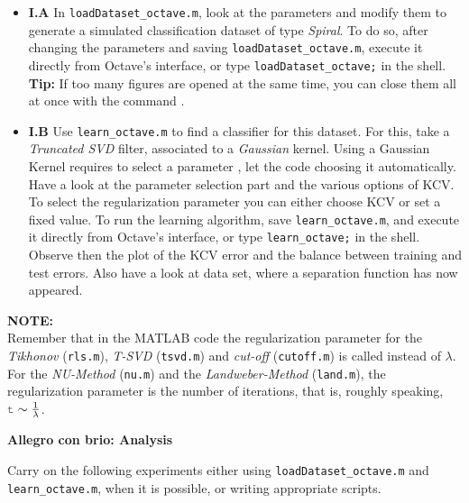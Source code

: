 \documentclass[DIN, pagenumber=false, fontsize=11pt, parskip=half]{scrartcl}
\newcommand{\mysection}[1]{\noindent\large\textbf{#1}}
\begin{document}
\begin{itemize}
	\item \textbf{I.A} In \texttt{loadDataset\_octave.m}, look at the parameters and modify them to generate a simulated classification dataset of type \textit{Spiral}.
	To do so, after changing the parameters and saving \texttt{loadDataset\_octave.m}, execute it directly from Octave's interface, or type \texttt{loadDataset\_octave;} in the shell.\\
	\textbf{Tip:} If too many figures are opened at the same time, you can close them all at once with the command .
	\item \textbf{I.B} 
	Use \texttt{learn\_octave.m} to find a  classifier for this dataset.
	For this, take a \textit{Truncated SVD} filter, associated to a \textit{Gaussian} kernel.
	Using a Gaussian Kernel requires to select a parameter , let the code choosing it automatically.
	Have a look at the parameter selection part and the various options of KCV. To select the regularization parameter you can either choose KCV or set a fixed value.
	To run the learning algorithm, save \texttt{learn\_octave.m}, and execute it directly from Octave's interface, or type \texttt{learn\_octave;} in the shell.
	Observe then the plot of the KCV error and the balance between training and test errors.
	Also have a look at data set, where a separation function has now appeared.
\end{itemize}

\begin{framed}
\textbf{NOTE:} \\
Remember that in the MATLAB code the regularization parameter for the \emph{Tikhonov} (\texttt{rls.m}), \emph{T-SVD} (\texttt{tsvd.m}) and \emph{cut-off} (\texttt{cutoff.m}) is called  instead of $\lambda$. For the \emph{NU-Method} (\texttt{nu.m}) and the \emph{Landweber-Method} (\texttt{land.m}), the regularization parameter  is the number of iterations, that is, roughly speaking, $\mcode{t} \sim \frac{1}{\lambda}$.
\end{framed}




\mysection{Allegro con brio: Analysis}

Carry on the following experiments either using \texttt{loadDataset\_octave.m} and \texttt{learn\_octave.m}, when it is possible, or writing appropriate scripts.
\end{document}
